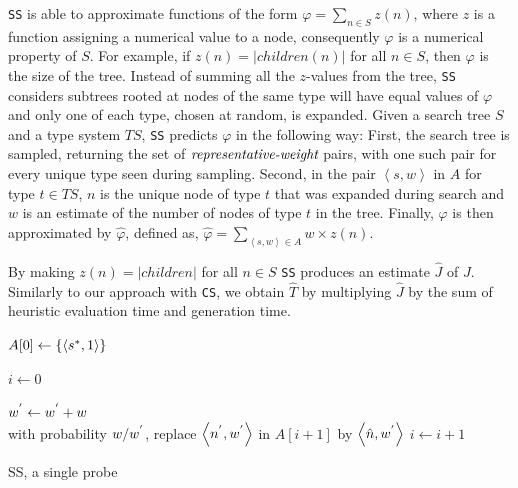 \texttt{SS} is able to approximate functions of the form $\varphi = \sum_{n \in S}z(n)$, where $z$ is a function assigning a numerical value to a node, consequently $\varphi$ is a numerical property of $S$. For example, if $z(n)=|children(n)|$ for all $n \in S$, then $\varphi$ is the size of the tree. Instead of summing all the $z$-values from the tree, \texttt{SS} considers  subtrees rooted at nodes of the same type will have equal values of $\varphi$ and only one of each type, chosen at random, is expanded. Given a search tree $S$ and a type system $TS$, \texttt{SS} predicts $\varphi$ in the following way: First, the search tree is sampled, returning the set of $\emph{representative-weight}$ pairs, with one such pair for every unique type seen during sampling. Second, in the pair $\left\langle s,w \right\rangle$ in $A$ for type $t \in TS$, $n$ is the unique node of type $t$ that was expanded during search and $w$ is an estimate of the number of nodes of type $t$ in the tree. Finally, $\varphi$ is then approximated by $\hat{\varphi}$, defined as, $\hat{\varphi} =  \sum_{\left\langle s,w \right\rangle \in A}w \times z(n)$.

By making $z(n) = |children|$ for all $n \in S$ \texttt{SS} produces an estimate $\hat{J}$ of $J$. Similarly to our approach with \texttt{CS}, we obtain $\hat{T}$ by multiplying $\hat{J}$ by the sum of heuristic evaluation time and generation time.

\begin{algorithm}

$A[0] \leftarrow \{\left\langle  s\sp{*},1 \right\rangle \}$

$i \leftarrow 0$

 {
	 {
		 {
			 {
				 {
				$w\sp{'} \leftarrow w\sp{'} + w$\\ 
				with probability $w/w\sp{'}$, replace $\left\langle n\sp{'}, w\sp{'} \right\rangle$ in $A[i+1]$ by $\left\langle \hat{n},w\sp{'} \right\rangle$
				} 
			}
		}
	}
	$i \leftarrow i + 1$
}
\caption{SS, a single probe}
\label{alg:ss_algorithm}
\end{algorithm}

